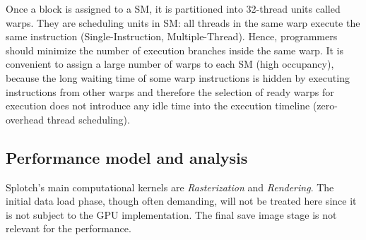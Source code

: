 \documentclass[11pt]{article}
\begin{document}
Once a block is assigned to a SM, it is partitioned into 32-thread units called warps. They are scheduling units in SM:
all threads in the same warp execute the same instruction (Single-Instruction, Multiple-Thread). Hence, programmers should minimize the number of execution branches inside the same warp. It is convenient to assign a large number of warps to each SM (high occupancy), because the long waiting time of some warp instructions is hidden by executing instructions from other warps  and therefore the selection of ready warps for execution does not introduce any idle time into the execution timeline (zero-overhead thread scheduling). 

\subsection{Performance model and analysis}
\label{sec:model}

Splotch's main computational kernels are {\it Rasterization} and {\it Rendering}.
The initial data load phase, though often demanding, will not be treated
here since it is not subject to the GPU implementation. The final save image stage
is not relevant for the performance.

%

\end{document}
